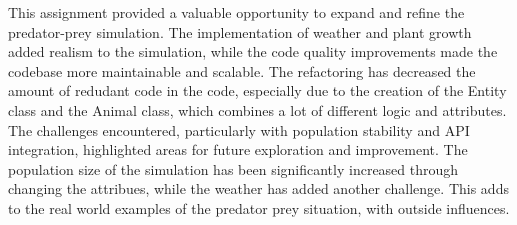 \documentclass{article}
\begin{document}
This assignment provided a valuable opportunity to expand and refine the predator-prey simulation. The implementation of weather and plant growth added realism to the simulation, while the code quality improvements made the codebase more maintainable and scalable. The refactoring has decreased the amount of redudant code in the code, especially due to the creation of the Entity class and the Animal class, which combines a lot of different logic and attributes. The challenges encountered, particularly with population stability and API integration, highlighted areas for future exploration and improvement. The population size of the simulation has been significantly increased through changing the attribues, while the weather has added another challenge. This adds to the real world examples of the predator prey situation, with outside influences.
\end{document}
